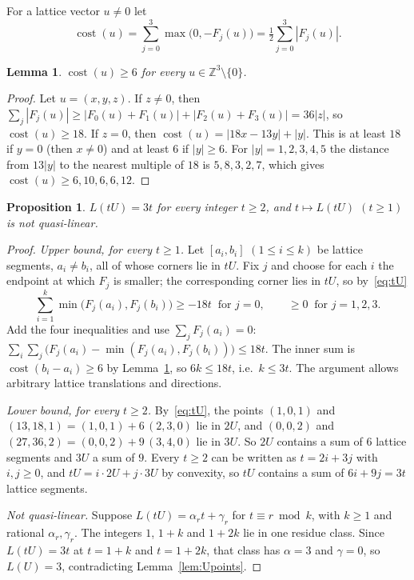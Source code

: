 \documentclass[11pt]{article}
\newtheorem{lemma}{Lemma}
\newtheorem{proposition}{Proposition}
\theoremstyle{definition}
\theoremstyle{remark}
\newcommand{\Z}{\mathbb Z}
\begin{document}
For a lattice vector $u\ne0$ let
\[
\operatorname{cost}(u)=\sum_{j=0}^{3}\max\bigl(0,-F_j(u)\bigr)
=\tfrac12\sum_{j=0}^{3}|F_j(u)| .
\]

\begin{lemma}\label{lem:cost}
$\operatorname{cost}(u)\ge6$ for every $u\in\Z^3\setminus\{0\}$.
\end{lemma}

\begin{proof}
Let $u=(x,y,z)$. If $z\ne0$, then
$\sum_j|F_j(u)|\ge|F_0(u)+F_1(u)|+|F_2(u)+F_3(u)|=36|z|$, so
$\operatorname{cost}(u)\ge18$. If $z=0$, then
$\operatorname{cost}(u)=|18x-13y|+|y|$. This is at least $18$ if $y=0$ (then
$x\ne0$) and at least $6$ if $|y|\ge6$. For $|y|=1,2,3,4,5$ the distance from
$13|y|$ to the nearest multiple of $18$ is $5,8,3,2,7$, which gives
$\operatorname{cost}(u)\ge6,10,6,6,12$.
\end{proof}

\begin{proposition}\label{prop:U}
$L(tU)=3t$ for every integer $t\ge2$, and $t\mapsto L(tU)$ $(t\ge1)$ is not
quasi-linear.
\end{proposition}

\begin{proof}
\emph{Upper bound, for every $t\ge1$.} Let $[a_i,b_i]$ $(1\le i\le k)$ be
lattice segments, $a_i\ne b_i$, all of whose corners lie in $tU$. Fix $j$ and
choose for each $i$ the endpoint at which $F_j$ is smaller; the corresponding
corner lies in $tU$, so by~\eqref{eq:tU}
\[
\sum_{i=1}^k\min\bigl(F_j(a_i),F_j(b_i)\bigr)\ge-18t\ \text{ for } j=0,
\qquad \ge0\ \text{ for } j=1,2,3 .
\]
Add the four inequalities and use $\sum_jF_j(a_i)=0$:
$\sum_i\sum_j\bigl(F_j(a_i)-\min(F_j(a_i),F_j(b_i))\bigr)\le18t$. The inner
sum is $\operatorname{cost}(b_i-a_i)\ge6$ by Lemma~\ref{lem:cost}, so
$6k\le18t$, i.e.\ $k\le3t$. The argument allows arbitrary lattice translations
and directions.

\emph{Lower bound, for every $t\ge2$.} By~\eqref{eq:tU}, the points $(1,0,1)$
and $(13,18,1)=(1,0,1)+6\,(2,3,0)$ lie in $2U$, and $(0,0,2)$ and
$(27,36,2)=(0,0,2)+9\,(3,4,0)$ lie in $3U$. So $2U$ contains a sum of $6$
lattice segments and $3U$ a sum of $9$. Every $t\ge2$ can be written as
$t=2i+3j$ with $i,j\ge0$, and $tU=i\cdot2U+j\cdot3U$ by convexity, so $tU$
contains a sum of $6i+9j=3t$ lattice segments.

\emph{Not quasi-linear.} Suppose $L(tU)=\alpha_rt+\gamma_r$ for $t\equiv r\bmod k$,
with $k\ge1$ and rational $\alpha_r,\gamma_r$. The integers $1$, $1+k$ and
$1+2k$ lie in one residue class. Since $L(tU)=3t$ at $t=1+k$ and $t=1+2k$,
that class has $\alpha=3$ and $\gamma=0$, so $L(U)=3$, contradicting
Lemma~\ref{lem:Upoints}.
\end{proof}
\end{document}
